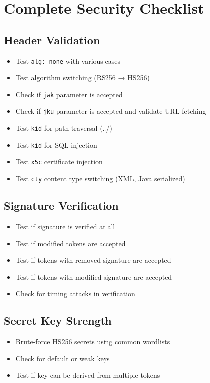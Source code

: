 \documentclass{article}
\begin{document}
\section{Complete Security Checklist}
\begin{checklistbox}
\subsection*{Header Validation}
\begin{itemize}
    \item [$\square$] Test \texttt{alg: none} with various cases
    \item [$\square$] Test algorithm switching (RS256 → HS256)
    \item [$\square$] Check if \texttt{jwk} parameter is accepted
    \item [$\square$] Check if \texttt{jku} parameter is accepted and validate URL fetching
    \item [$\square$] Test \texttt{kid} for path traversal (../)
    \item [$\square$] Test \texttt{kid} for SQL injection
    \item [$\square$] Test \texttt{x5c} certificate injection
    \item [$\square$] Test \texttt{cty} content type switching (XML, Java serialized)
\end{itemize}

\subsection*{Signature Verification}
\begin{itemize}
    \item [$\square$] Test if signature is verified at all
    \item [$\square$] Test if modified tokens are accepted
    \item [$\square$] Test if tokens with removed signature are accepted
    \item [$\square$] Test if tokens with modified signature are accepted
    \item [$\square$] Check for timing attacks in verification
\end{itemize}

\subsection*{Secret Key Strength}
\begin{itemize}
    \item [$\square$] Brute-force HS256 secrets using common wordlists
    \item [$\square$] Check for default or weak keys
    \item [$\square$] Test if key can be derived from multiple tokens
\end{itemize}
\end{checklistbox}
\end{document}
